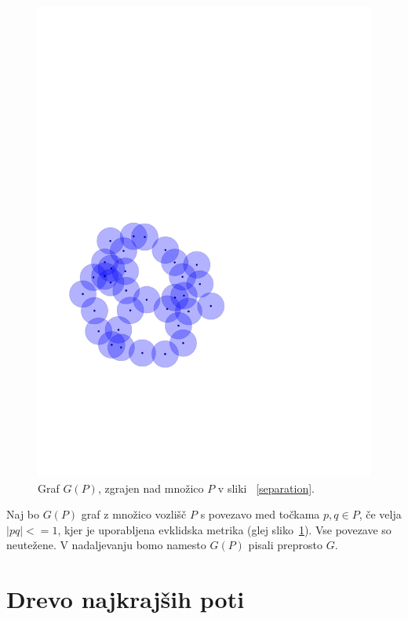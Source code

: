 \documentclass[a4paper, 12pt]{book}
\begin{document}
\begin{figure}
\centerline{\includegraphics[scale=0.6,page=5]{pics/unitdisks.pdf}}
\caption{Graf $G(P)$, zgrajen nad množico $P$ v sliki ~\ref{separation}.}
\label{gdisks}
\end{figure}

Naj bo $G(P)$ graf z množico vozlišč $P$ s povezavo med točkama $p,q \in P$, če velja $|pq| <= 1$, kjer je uporabljena evklidska metrika (glej sliko~\ref{gdisks}). Vse povezave so neutežene. V nadaljevanju bomo namesto $G(P)$ pisali preprosto $G$.
\section{Drevo najkrajših poti}
\end{document}
